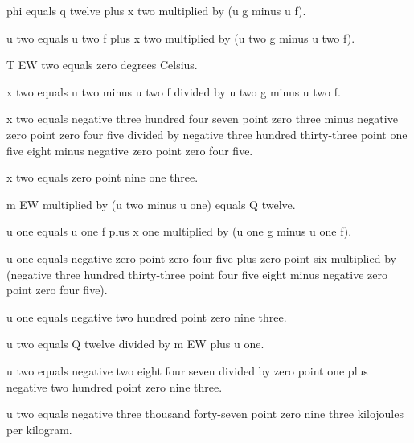phi equals q twelve plus x two multiplied by (u g minus u f).  

u two equals u two f plus x two multiplied by (u two g minus u two f).  

T EW two equals zero degrees Celsius.  

x two equals u two minus u two f divided by u two g minus u two f.  

x two equals negative three hundred four seven point zero three minus negative zero point zero four five divided by negative three hundred thirty-three point one five eight minus negative zero point zero four five.  

x two equals zero point nine one three.  

m EW multiplied by (u two minus u one) equals Q twelve.  

u one equals u one f plus x one multiplied by (u one g minus u one f).  

u one equals negative zero point zero four five plus zero point six multiplied by (negative three hundred thirty-three point four five eight minus negative zero point zero four five).  

u one equals negative two hundred point zero nine three.  

u two equals Q twelve divided by m EW plus u one.  

u two equals negative two eight four seven divided by zero point one plus negative two hundred point zero nine three.  

u two equals negative three thousand forty-seven point zero nine three kilojoules per kilogram.